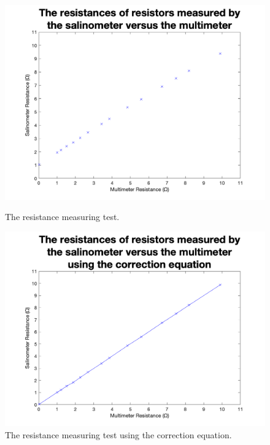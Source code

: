 \begin{figure}[!h]
    \centering
    \begin{minipage}{.5\textwidth}
        \centering
        \includegraphics[width=\textwidth]{Figures/Testing/R_uncorrected}
        \caption{The resistance measuring test.}
        \label{fig:resistance-measuring-accuracy-uncorrected} %
    \end{minipage}%
    \begin{minipage}{.5\textwidth}
        \centering
        \includegraphics[width=\textwidth]{Figures/Testing/R_corrected}
        \caption{The resistance measuring test using the correction equation.}
        \label{fig:resistance-measuring-accuracy-corrected} %
    \end{minipage}
\end{figure}

